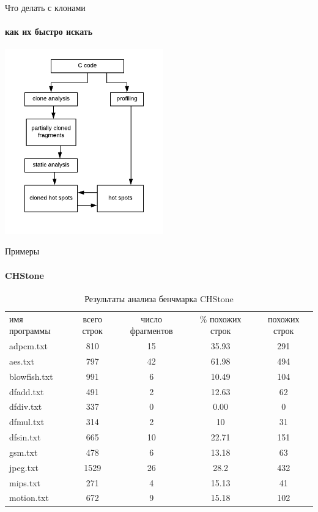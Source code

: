 \documentclass{beamer}              %
\begin{document}
\begin{frame}{Что делать с клонами}
\framesubtitle{как их быстро искать}
  \includegraphics[height=8cm]{img/ClonesFlow.png}
\end{frame}

\begin{frame}{Примеры}
  \framesubtitle{CHStone}
  \begin{table}[htp]
	\begin{centering}
\begin{tabular}{ l c c c c }
\hline
имя программы & всего строк & число фрагментов & \% похожих строк & похожих строк \\
adpcm.txt &	810 &	15	& 35.93 &	291 \\
aes.txt &	797 &	42 &	61.98 &	494     \\
blowfish.txt &	991 &	6 &	10.49 &	104 \\
dfadd.txt &	491 &	2 &	12.63 &	62   \\
dfdiv.txt &	337 &	0 &	0.00 &	0   \\
dfmul.txt &	314 &	2 &	10 &	31  \\
dfsin.txt & 	665 &	10 &	22.71 &	151 \\
gsm.txt	& 478 &	6 &	13.18 &	63      \\
jpeg.txt &	1529 &	26 &	28.2 &	432 \\
mips.txt &	271 &	4 &	15.13 &	41   \\
motion.txt &	672 &	9 &	 15.18 &	102 \\
\hline
\end{tabular}
\caption{Результаты анализа бенчмарка CHStone}
\label{tab:CHStone}
\end{centering}
\end{table}
\end{frame}
\end{document}
